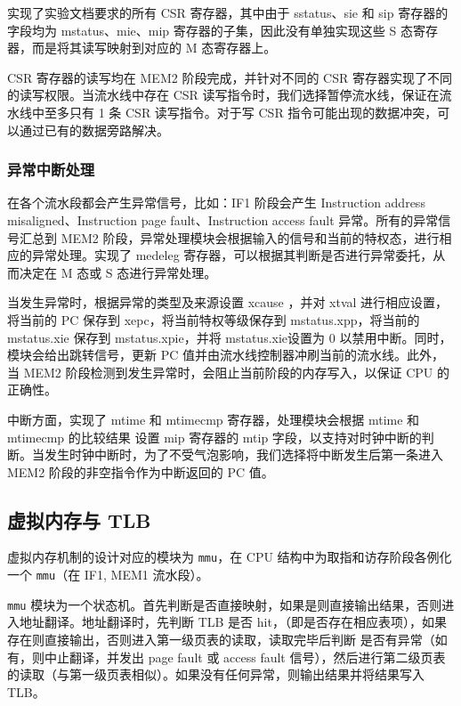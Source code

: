 \documentclass[12pt,a4paper,oneside]{ctexart}
\begin{document}
实现了实验文档要求的所有 CSR 寄存器，其中由于 sstatus、sie 和 sip 寄存器的字段均为 mstatus、mie、mip 寄存器的子集，因此没有单独实现这些 S 态寄存器，而是将其读写映射到对应的 M 态寄存器上。

CSR 寄存器的读写均在 MEM2 阶段完成，并针对不同的 CSR 寄存器实现了不同的读写权限。当流水线中存在 CSR  读写指令时，我们选择暂停流水线，保证在流水线中至多只有 1 条 CSR 读写指令。对于写 CSR 指令可能出现的数据冲突，可以通过已有的数据旁路解决。

\subsubsection{异常中断处理}

在各个流水段都会产生异常信号，比如：IF1 阶段会产生 Instruction address misaligned、Instruction  page fault、Instruction access fault 异常。所有的异常信号汇总到 MEM2 阶段，异常处理模块会根据输入的信号和当前的特权态，进行相应的异常处理。实现了 medeleg 寄存器，可以根据其判断是否进行异常委托，从而决定在 M 态或 S 态进行异常处理。

当发生异常时，根据异常的类型及来源设置 xcause ，并对 xtval 进行相应设置，将当前的 PC 保存到 xepc，将当前特权等级保存到 mstatus.xpp，将当前的 mstatus.xie 保存到 mstatus.xpie，并将 mstatus.xie设置为 0 以禁用中断。同时，模块会给出跳转信号，更新 PC 值并由流水线控制器冲刷当前的流水线。此外，当 MEM2 阶段检测到发生异常时，会阻止当前阶段的内存写入，以保证 CPU 的正确性。

中断方面，实现了 mtime 和 mtimecmp 寄存器，处理模块会根据 mtime 和 mtimecmp 的比较结果 设置 mip 寄存器的 mtip 字段，以支持对时钟中断的判断。当发生时钟中断时，为了不受气泡影响，我们选择将中断发生后第一条进入 MEM2 阶段的非空指令作为中断返回的 PC 值。
 
\subsection{虚拟内存与 TLB}

虚拟内存机制的设计对应的模块为 \texttt{mmu}，在 CPU 结构中为取指和访存阶段各例化一个 \texttt{mmu}（在 IF1, MEM1 流水段）。

\texttt{mmu} 模块为一个状态机。首先判断是否直接映射，如果是则直接输出结果，否则进入地址翻译。地址翻译时，先判断 TLB 是否 hit，（即是否存在相应表项），如果存在则直接输出，否则进入第一级页表的读取，读取完毕后判断 是否有异常（如有，则中止翻译，并发出 page fault 或 access fault 信号），然后进行第二级页表的读取（与第一级页表相似）。如果没有任何异常，则输出结果并将结果写入 TLB。
\end{document}
